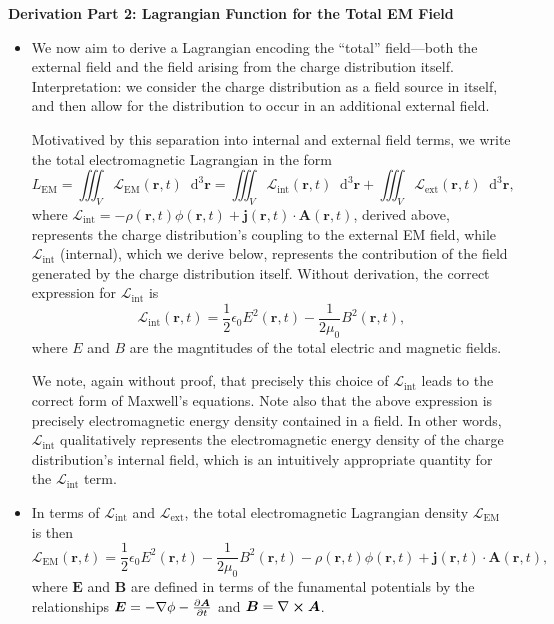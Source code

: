 \documentclass[11pt, a4paper]{article}
\newcommand{\diff}{\mathop{}\!\mathrm{d}} %
\newcommand{\dr}{\diff^{3} \r}  %
\renewcommand{\L}{\mathcal{L}}  %
\renewcommand{\vec}[1]{\bm{#1}} %
\renewcommand{\r}{\vec{r}}
\newcommand{\E}{\vec{E}} %
\newcommand{\B}{\vec{B}} %
\newcommand{\A}{\vec{A}} %
\newcommand{\ee}{\epsilon_{0}}  %
\newcommand{\mm}{\mu_{0}}  %
\renewcommand{\j}{\vec{j}}  %
\renewcommand{\curl}{\nabla \cross}
\renewcommand{\grad}{\nabla}
\begin{document}
\textbf{Derivation Part 2: Lagrangian Function for the Total EM Field}
\begin{itemize}
	\item We now aim to derive a Lagrangian encoding the ``total'' field---both the external field and the field arising from the charge distribution itself. Interpretation: we consider the charge distribution as a field source in itself, and then allow for the distribution to occur in an additional external field.
	
	Motivatived by this separation into internal and external field terms, we write the total electromagnetic Lagrangian in the form
	\begin{equation*}
		L_{\text{EM}} = \iiint_{V} \L_{\text{EM}}(\r, t) \dr = \iiint_{V} \L_{\text{int}}(\r, t) \dr + \iiint_{V} \L_{\text{ext}}(\r, t)\dr,
	\end{equation*}
    where $ \L_{\text{int}} = - \rho(\r, t) \phi(\r, t) + \j(\r, t)\cdot \A(\r, t) $, derived above, represents the charge distribution's coupling to the external EM field, while $ \L_{\text{int}} $ (internal), which we derive below, represents the contribution of the field generated by the charge distribution itself. Without derivation, the correct expression for $ \L_{\text{int}} $ is
	\begin{equation*}
		\L_{\text{int}}(\r, t) = \frac{1}{2}\ee E^{2}(\r, t) - \frac{1}{2\mm}B^{2}(\r, t),
	\end{equation*}
    where $ E $ and $ B $ are the magntitudes of the total electric and magnetic fields.

	We note, again without proof, that precisely this choice of $ \L_{\text{int}} $ leads to the correct form of Maxwell's equations. Note also that the above expression is precisely electromagnetic energy density contained in a field. In other words, $ \L_{\text{int}} $ qualitatively represents the electromagnetic energy density of the charge distribution's internal field, which is an intuitively appropriate quantity for the $ \L_{\text{int}} $ term.
	
	\item In terms of $ \L_{\text{int}} $ and $ \L_{\text{ext}} $, the total electromagnetic Lagrangian density $ \L_{\text{EM}} $ is then
	\begin{equation*}
		\L_{\text{EM}}(\r, t) = \frac{1}{2}\ee E^{2}(\r, t) - \frac{1}{2\mm}B^{2}(\r, t) - \rho(\r, t)\phi(\r, t) + \j(\r, t) \cdot \A(\r, t),
	\end{equation*}
	where $ \E $ and $ \B $ are defined in terms of the funamental potentials by the relationships $ \E = - \grad \phi - \pdv{\A}{t} $ and $ \B = \curl \A $.
\end{itemize}
\end{document}
